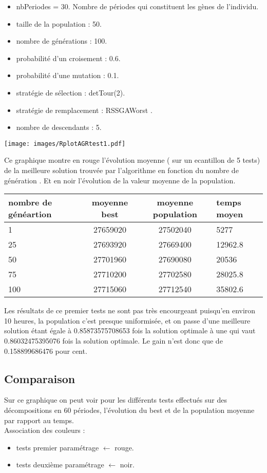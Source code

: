 \documentclass[a4paper]{report}
\begin{document}
\begin{itemize}
\item nbPeriodes = 30. Nombre de périodes qui constituent les gènes de l'individu.
\item taille de la population : 50.
\item nombre de générations : 100.
\item probabilité d'un croisement : 0.6.
\item probabilité d'une mutation : 0.1.
\item stratégie de sélection : detTour(2).
\item stratégie de remplacement : RSSGAWorst .
\item nombre de descendants : 5.

\end{itemize}
\begin{center}
\texttt{[image: images/RplotAGRtest1.pdf]}
\end{center}
Ce graphique montre  en rouge l'évolution moyenne ( sur un ecantillon de 5 tests) de la  meilleure solution trouvée par l'algorithme en fonction du nombre de génération . Et en noir l'évolution de la valeur moyenne de la population.\\
\begin{tabular}{|l|c|c|l|}
  \hline
  nombre de généartion &moyenne best &moyenne population&temps moyen\\

  \hline
 1 &27659020&27502040&5277\\
  \hline
25 &  27693920& 27669400&  12962.8
\\
  \hline
  50&   27701960&27690080& 20536
\\
  \hline
  75 &27710200&27702580&28025.8


\\
  \hline
 100 &  27715060&27712540& 35802.6 \\
  \hline
  
\end{tabular}
Les résultats de ce premier tests ne sont pas très encourgeant puisqu'en environ  10 heures, la population c'est presque uniformisée, et on passe d'une meilleure solution étant égale à 0.85873575708653 fois la solution optimale  à une qui vaut 0.86032475395076 fois la solution optimale. Le gain n'est donc que de 0.158899686476 pour cent.
\subsection{Comparaison}
Sur ce graphique on peut voir pour les différents tests effectués sur des décompositions en 60 périodes, l'évolution du best et de la population moyenne par rapport au temps.\\
Association des couleurs :\\
\begin{itemize}
  \item tests premier paramétrage $\leftarrow $ rouge.\\
  \item tests deuxième paramétrage $\leftarrow $ noir.\\
 
\end{itemize}
\end{document}
